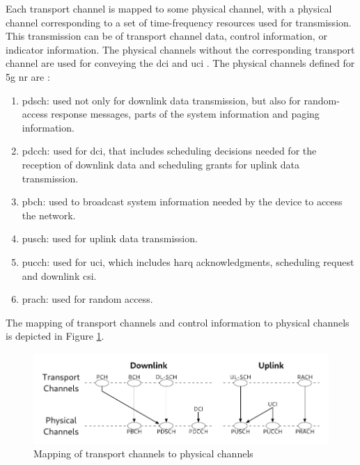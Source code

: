 Each transport channel is mapped to some physical channel, with a physical channel corresponding to a set of time-frequency resources used for transmission.
%
This transmission can be of transport channel data, control information, or indicator information.
%
The physical channels without the corresponding transport channel are used for conveying the \gls{dci} and \gls{uci} \cite{ErikDahlman5G}.
%
The physical channels defined for \gls{5g} \gls{nr} are \cite{3gpp.38.211}:

\begin{enumerate}
    \item \Gls{pdsch}: used not only for downlink data transmission, but also for random-access response messages, parts of the system information and paging information.
    \item \Gls{pdcch}: used for \gls{dci}, that includes scheduling decisions needed for the reception of downlink data and scheduling grants for uplink data transmission.
    \item \Gls{pbch}: used to broadcast system information needed by the device to access the network.
    \item \Gls{pusch}: used for uplink data transmission.
    \item \Gls{pucch}: used for \gls{uci}, which includes \gls{harq} acknowledgments, scheduling request and downlink \gls{csi}.
    \item \Gls{prach}: used for random access.
\end{enumerate}

The mapping of transport channels and control information to physical channels is depicted in Figure \ref{fig:channel-mapping}.

\begin{figure}[htbp]
    \includegraphics[width=0.95\columnwidth]{figures/chp_theory/complete.pdf}
    \caption{Mapping of transport channels to physical channels}
    \label{fig:channel-mapping}
\end{figure}



